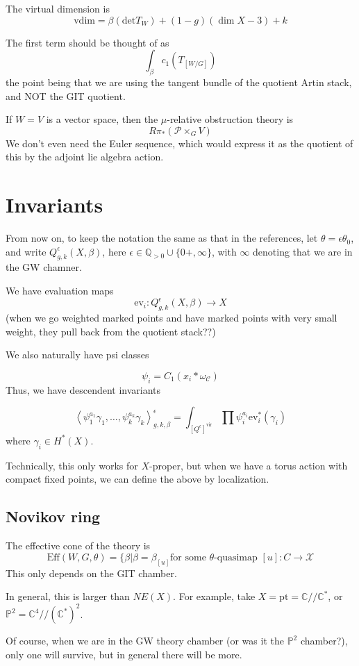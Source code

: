\documentclass{amsart}
\theoremstyle{definition}
\newcommand{\GIT}{//}
\newcommand{\proj}{\mathbb{P}}
\newcommand{\Q}{\mathbb{Q}}
\newcommand{\C}{\mathbb{C}}
\newcommand{\ev}{\text{ev}}
\newcommand{\vir}{\text{vir}}
\begin{document}
The virtual dimension is 
$$\text{vdim}=\beta(\text{det} T_W)+(1-g)(\dim X-3)+k$$

The first term should be thought of as
$$\int_{\beta} c_1(T_{[W/G]})$$
the point being that we are using the tangent bundle of the quotient Artin stack, and NOT the GIT quotient.


If $W=V$ is a vector space, then the $\mu$-relative obstruction theory is 
$$R\pi_*(\mathcal{P}\times_G V)$$
We don't even need the Euler sequence, which would express it as the quotient of this by the adjoint lie algebra action.

\section{Invariants}

From now on, to keep the notation the same as that in the references, let $\theta=\epsilon\theta_0$, and write $Q^\epsilon_{g,k}(X,\beta)$, here $\epsilon\in\Q_{>0}\cup\{0+,\infty\}$, with $\infty$ denoting that we are in the GW chamner.

We have evaluation maps
$$\ev_i:Q^\epsilon_{g,k}(X,\beta)\to X$$
(when we go weighted marked points and have marked points with very small weight, they pull back from the quotient stack??)

We also naturally have psi classes

$$\psi_i=C_1(x_i*\omega_{\mathcal{C}})$$
Thus, we have descendent invariants

$$\left\langle \psi^{a_1}_1\gamma_1,\dots,\psi_k^{a_k}\gamma_k\right\rangle^\epsilon_{g,k,\beta}=
\int_{[Q^\epsilon]^\vir} \prod \psi_i^{a_i} \ev_i^*(\gamma_i)$$
where $\gamma_i\in H^*(X)$.

Technically, this only works for $X$-proper, but when we have a torus action with compact fixed points, we can define the above by localization.

\subsection{Novikov ring}
The effective cone of the theory is 
$$\text{Eff}(W,G,\theta)=\{\beta|\beta=\beta_{[u]}\text{for some $\theta$-quasimap } [u]:C\to\mathcal{X}$$
This only depends on the GIT chamber.


In general, this is larger than $NE(X)$.  For example, take $X=\text{pt}=\C\GIT\C^*$, or $\proj^2=\C^4\GIT(\C^*)^2$.

Of course, when we are in the GW theory chamber (or was it the $\proj^2$ chamber?), only one will survive, but in general there will be more.
\end{document}
